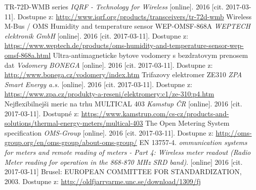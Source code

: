 \begin{literatura}{99}
	 TR-72D-WMB series \textit{IQRF - Technology for Wireless} [online]. 2016 [cit. 2017-03-11]. Dostupne z: \url{http://www.iqrf.org/products/transceivers/tr-72d-wmb}
	 Wireless M-Bus / OMS Humidity and temperature sensor WEP-OMSF-868A \textit{WEPTECH elektronik GmbH} [online]. 2016 [cit. 2017-03-11]. Dostupne z: \url{https://www.weptech.de/products/oms-humidity-and-temperature-sensor-wep-omsf-868a.html}
	 Ultra-antimagneticke bytove vodomery s bezdratovym prenosem dat \textit{Vodomery BONEGA} [online]. 2016 [cit. 2017-03-11]. Dostupne z: \url{http://www.bonega.cz/vodomery/index.htm}
	 Trifazovy elektromer ZE310 \textit{ZPA Smart Energy a.s.} [online]. 2016 [cit. 2017-03-11]. Dostupne z: \url{https://www.zpa.cz/produkty-a-reseni/elektromery:c1/ze-310:p4.htm}
	 Nejflexibilnejši meric na trhu MULTICAL 403 \textit{Kamstup ČR} [online]. 2016 [cit. 2017-03-11]. Dostupné z: \url{https://www.kamstrup.com/cs-cz/products-and-solutions/thermal-energy-meters/multical-403}
	 The Open Metering System specification \textit{OMS-Group} [online]. 2016 [cit. 2017-03-11]. Dostupne z: \url{http://oms-group.org/en/oms-group/about-oms-group/}
	 EN 13757-4. \textit{ommunication systems for meters and remote reading of meters - Part 4: Wireless meter readout (Radio Meter reading for operation in the 868-870 MHz SRD band)}. [online] 2016 [cit. 2017-03-11] Brusel: EUROPEAN COMMITTEE FOR STANDARDIZATION, 2003. Dostupne z: \url{http://oldfjarrvarme.unc.se/download/1309/fj}


\end{literatura}

